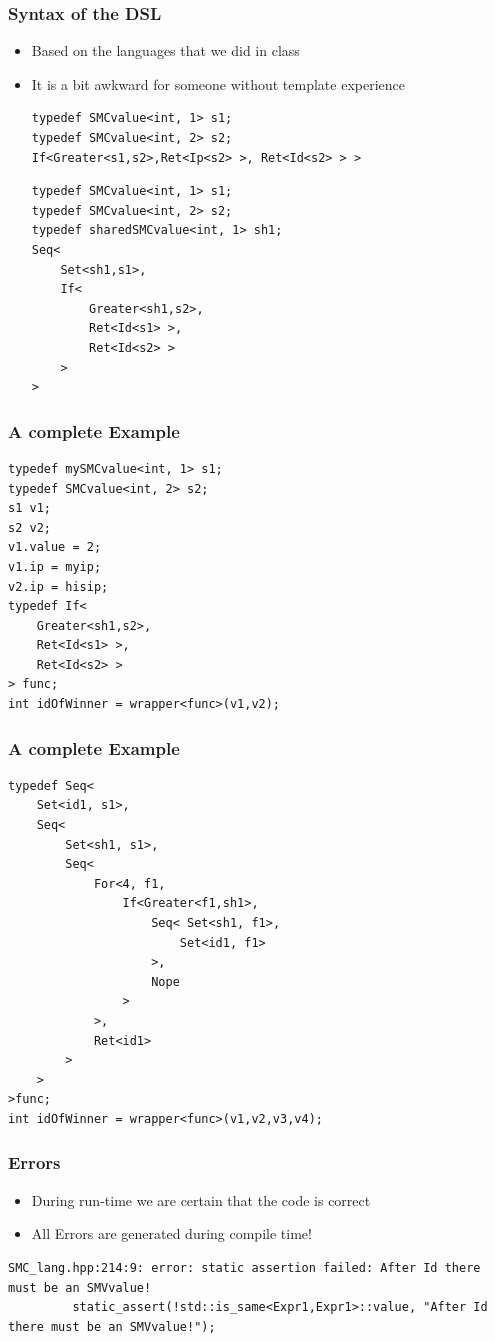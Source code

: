 \documentclass{beamer}
\begin{document}
\begin{frame}[fragile]
\frametitle{Syntax of the DSL}
\begin{itemize}
\item Based on the languages that we did in class
\item It is a bit awkward for someone without template experience
\begin{lstlisting}
typedef SMCvalue<int, 1> s1;
typedef SMCvalue<int, 2> s2;
If<Greater<s1,s2>,Ret<Ip<s2> >, Ret<Id<s2> > >
\end{lstlisting}
\begin{lstlisting}
typedef SMCvalue<int, 1> s1;
typedef SMCvalue<int, 2> s2;
typedef sharedSMCvalue<int, 1> sh1;
Seq<
    Set<sh1,s1>,
    If<
        Greater<sh1,s2>,
        Ret<Id<s1> >,
        Ret<Id<s2> >
    >
>
\end{lstlisting}
\end{itemize}
\end{frame}

\begin{frame}[fragile]
\frametitle{A complete Example}
\begin{lstlisting}
typedef mySMCvalue<int, 1> s1;
typedef SMCvalue<int, 2> s2;
s1 v1;
s2 v2;
v1.value = 2;
v1.ip = myip;
v2.ip = hisip;
typedef If<
    Greater<sh1,s2>,
    Ret<Id<s1> >,
    Ret<Id<s2> >
> func;
int idOfWinner = wrapper<func>(v1,v2);
\end{lstlisting}
\end{frame}

\begin{frame}[fragile]
\frametitle{A complete Example}
\begin{lstlisting}
typedef Seq<
    Set<id1, s1>,
    Seq<
        Set<sh1, s1>,
        Seq<
            For<4, f1,
                If<Greater<f1,sh1>,
                    Seq< Set<sh1, f1>,
                        Set<id1, f1>
                    >,
                    Nope
                >
            >,
            Ret<id1>
        >
    >
>func;
int idOfWinner = wrapper<func>(v1,v2,v3,v4);
\end{lstlisting}
\end{frame}



\begin{frame}[fragile]
\frametitle{Errors}
\begin{itemize}
\item During run-time we are certain that the code is correct
\item All Errors are generated during compile time! 
\end{itemize}
\begin{lstlisting}
SMC_lang.hpp:214:9: error: static assertion failed: After Id there must be an SMVvalue!
         static_assert(!std::is_same<Expr1,Expr1>::value, "After Id there must be an SMVvalue!");
\end{lstlisting}
\end{frame}
\end{document}
